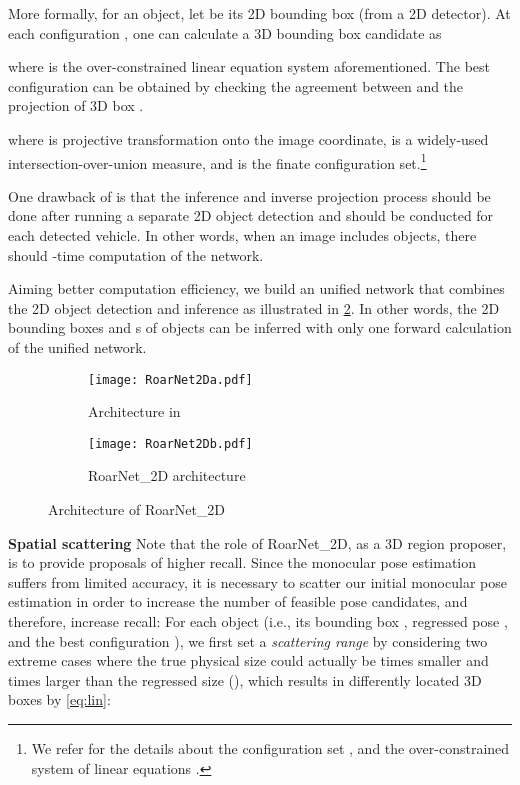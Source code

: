 \documentclass[letterpaper, 10 pt, conference]{ieeeconf}
\newcommand{\subsec}{\quad}
\begin{document}
More formally, for an object, let  be its 2D bounding box (from a 2D detector). At each configuration , one can calculate a 3D bounding box candidate  as

where  is the over-constrained linear equation system aforementioned.
The best configuration  can be obtained by checking the agreement between  and the projection of 3D box .

where  is projective transformation onto the image coordinate,  is a widely-used intersection-over-union measure, and  is the finate configuration set.\footnote{We refer \cite{mousavian_3d_2017} for the details about the configuration set , and the over-constrained system of linear equations .}


One drawback of \cite{mousavian_3d_2017} is that the  inference and inverse projection process should be done after running a separate 2D object detection and should be conducted for each detected vehicle. In other words, when an image includes  objects, there should -time computation of the network.

Aiming better computation efficiency, we build an unified network that combines the 2D object detection and  inference as illustrated in \cref{fig:gas}. In other words, the 2D bounding boxes and s of  objects can be inferred with only one forward calculation of the unified network.

\begin{figure}
	\centering
	\begin{subfigure}{0.47\linewidth}
		\centering
		\texttt{[image: RoarNet2Da.pdf]}
		\caption{Architecture in \cite{mousavian_3d_2017}}\label{fig:mousavian}
	\end{subfigure}
    \hfill
    \begin{subfigure}{0.48\linewidth}
		\centering
        \texttt{[image: RoarNet2Db.pdf]}
\caption{RoarNet\_2D architecture}\label{fig:gas}
	\end{subfigure}
\caption{Architecture of RoarNet\_2D \label{fig:roar2d}}
\end{figure}


\textbf{Spatial scattering\subsec}
Note that the role of RoarNet\_2D, as a 3D region proposer, is to provide proposals of higher recall.
Since the monocular pose estimation suffers from limited accuracy, it is necessary to scatter our initial monocular pose estimation in order to increase the number of feasible pose candidates, and therefore, increase recall: For each object (i.e., its bounding box , regressed pose , and the best configuration ),
we first set a \emph{scattering range} by considering two extreme cases where the true physical size could actually be  times smaller and  times larger than the regressed size  (), which results in differently located 3D boxes by \cref{eq:lin}:
\end{document}
